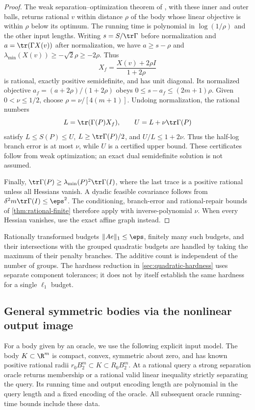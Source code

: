 \begin{proof}
The weak separation--optimization theorem of
\citet[Definition (5) and Theorem (3.1)]{gls1981}, with these inner and
outer balls, returns rational $v$ within distance $\rho$ of the body
whose linear objective is within $\rho$ below its optimum. The running
time is polynomial in $\log(1/\rho)$ and the other input lengths.
Writing $s=S/\tr\Gamma$ before normalization and
$a=\tr(\Gamma X(v))$ after normalization, we have
$a\ge s-\rho$ and $\lambda_{\min}(X(v))\ge-\sqrt2\rho\ge-2\rho$.
Thus
\begin{equation}\label{eq:correlation-repair}
 X_f=\frac{X(v)+2\rho I}{1+2\rho}
\end{equation}
is rational, exactly positive semidefinite, and has unit diagonal.
Its normalized objective $a_f=(a+2\rho)/(1+2\rho)$ obeys
$0\le s-a_f\le(2m+1)\rho$. Given $0<\nu\le1/2$, choose
$\rho=\nu/[4(m+1)]$. Undoing normalization, the rational numbers
\[
 L=\tr(\Gamma(P)X_f),\qquad U=L+\nu\tr\Gamma(P)
\]
satisfy $L\le S(P)\le U$, $L\ge\tr\Gamma(P)/2$, and $U/L\le1+2\nu$.
Thus the half-log branch error is at most $\nu$, while $U$ is a
certified upper bound. These certificates follow from weak optimization;
an exact dual semidefinite solution is not assumed.

Finally, $\tr\Gamma(P)\ge\lambda_{\min}(P)^2\tr\Gamma(I)$, where the
last trace is a positive rational unless all Hessians vanish. A dyadic
feasible covariance follows from
$\delta^2m\tr\Gamma(I)\le\eps^2$. The conditioning, branch-error and
rational-repair bounds of \cref{thm:rational-finite} therefore apply with
inverse-polynomial $\nu$. When every Hessian vanishes, use the exact
affine graph instead.
\end{proof}

Rationally transformed budgets $\|Ae\|_1\le\eps$, finitely many such
budgets, and their intersections with the grouped quadratic budgets are
handled by taking the maximum of their penalty branches. The additive
count is independent of the number of groups. The hardness reduction
in \cref{sec:quadratic-hardness} uses separate component tolerances;
it does not by itself establish the same hardness for a single
$\ell_1$ budget.

\subsection{General symmetric bodies via the nonlinear output image}

For a body given by an oracle, we use the following explicit input model.
The body $K\subset\R^m$ is compact, convex, symmetric about zero, and
has known positive rational radii
$r_0B_2^m\subset K\subset R_0B_2^m$. At a rational query a strong
separation oracle returns membership or a rational valid linear inequality
strictly separating the query. Its running time and output encoding length
are polynomial in the query length and a fixed encoding of the oracle.
All subsequent oracle running-time bounds include these data.

